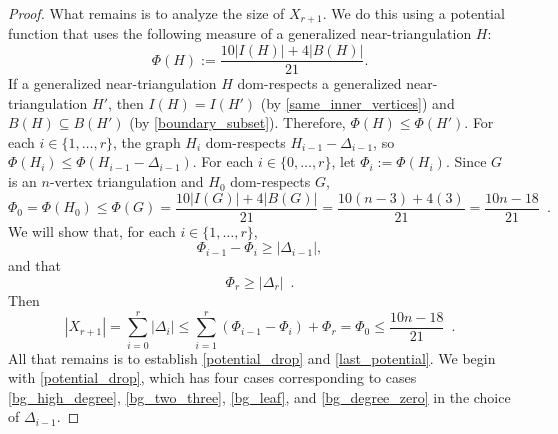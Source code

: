 \documentclass{patmorin}
\begin{document}
\begin{proof}
  What remains is to analyze the size of $X_{r+1}$.
  We do this using a potential function that uses the following measure of a generalized near-triangulation $H$: 
  \[
     \Phi(H):=\frac{10|I(H)|+4|B(H)|}{21}.
  \]
  If a generalized near-triangulation $H$ dom-respects a generalized near-triangulation $H'$, then $I(H)=I(H')$ (by \ref{same_inner_vertices}) and $B(H)\subseteq B(H')$ (by \ref{boundary_subset}). Therefore, $\Phi(H)\le \Phi(H')$.
  For each $i\in\{1,\ldots,r\}$, the graph $H_i$ dom-respects $H_{i-1}-\Delta_{i-1}$, so $\Phi(H_i)\le\Phi(H_{i-1}-\Delta_{i-1})$.  
  For each $i\in\{0,\ldots,r\}$, let $\Phi_i:=\Phi(H_i)$.  Since $G$ is an $n$-vertex triangulation and $H_0$ dom-respects $G$,
  \[
    \Phi_0 = \Phi(H_0) \le \Phi(G) 
      = \frac{10|I(G)|+4|B(G)|}{21} 
      = \frac{10(n-3)+4(3)}{21} = \frac{10n-18}{21} \enspace .
  \]
  We will show that, for each $i\in\{1,\ldots,r\}$,
  \begin{equation}
     \Phi_{i-1}-\Phi_{i} \ge |\Delta_{i-1}|, \label{potential_drop}
  \end{equation}
  and that
  \begin{equation}
    \Phi_r \ge |\Delta_r| \enspace . \label{last_potential}
  \end{equation}
  Then
  \[
      |X_{r+1}| = \sum_{i=0}^r|\Delta_i| 
      \le \sum_{i=1}^{r}(\Phi_{i-1}-\Phi_i)+\Phi_r 
      =  \Phi_0 \le 
      \frac{10n-18}{21} \enspace .  
  \]
  All that remains is to establish \eqref{potential_drop} and \eqref{last_potential}.  We begin with \eqref{potential_drop}, which has four cases corresponding to cases \ref{bg_high_degree}, \ref{bg_two_three}, \ref{bg_leaf}, and \ref{bg_degree_zero} in the choice of $\Delta_{i-1}$.
  

\end{proof}
\end{document}
